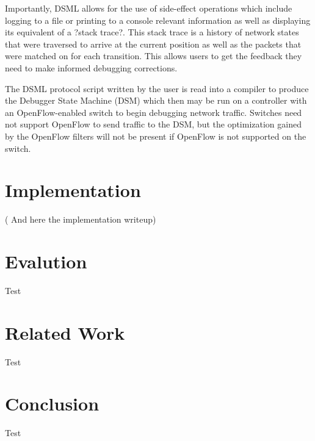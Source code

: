 \documentclass[letterpaper,twocolumn,10pt]{article}
\begin{document}
Importantly, DSML allows for the use of side-effect operations which include logging to a file or printing to a console relevant information as well as displaying its equivalent of a ?stack trace?. This stack trace is a history of network states that were traversed to arrive at the current position as well as the packets that were matched on for each transition. This allows users to get the feedback they need to make informed debugging corrections.

The DSML protocol script written by the user is read into a compiler to produce the Debugger State Machine (DSM) which then may be run on a controller with an OpenFlow-enabled switch to begin debugging network traffic. Switches need not support OpenFlow to send traffic to the DSM, but the optimization gained by the OpenFlow filters will not be present if OpenFlow is not supported on the switch.

\section{\LARGE Implementation}

( And here the implementation writeup)

\section{\LARGE Evalution}

Test

\section{\LARGE Related Work}

Test

\section{\LARGE Conclusion}

Test


{
  \footnotesize 
  \small 
  
  
}
\end{document}
